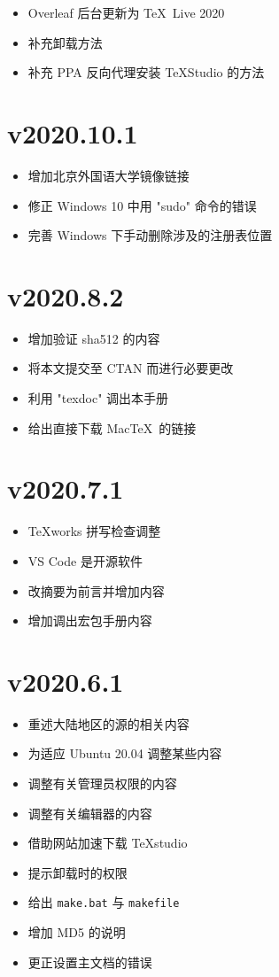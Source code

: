 \begin{itemize}
  \item Overleaf 后台更新为 \TeX~Live 2020
  \item 补充卸载方法
  \item 补充 PPA 反向代理安装 \TeX Studio 的方法
\end{itemize}

\section*{v2020.10.1}

\begin{itemize}
  \item 增加北京外国语大学镜像链接
  \item 修正 Windows 10 中用 "sudo" 命令的错误
  \item 完善 Windows 下手动删除涉及的注册表位置
\end{itemize}

\section*{v2020.8.2}

\begin{itemize}
  \item 增加验证 sha512 的内容
  \item 将本文提交至 CTAN 而进行必要更改
  \item 利用 "texdoc" 调出本手册
  \item 给出直接下载 Mac\TeX\ 的链接
\end{itemize}

\section*{v2020.7.1}

\begin{itemize}
  \item \TeX works 拼写检查调整
  \item VS Code 是开源软件
  \item 改摘要为前言并增加内容
  \item 增加调出宏包手册内容
\end{itemize}

\section*{v2020.6.1}

\begin{itemize}
  \item 重述大陆地区的源的相关内容
  \item 为适应 Ubuntu 20.04 调整某些内容
  \item 调整有关管理员权限的内容
  \item 调整有关编辑器的内容
  \item 借助网站加速下载 TeXstudio
  \item 提示卸载时的权限
  \item 给出 \texttt{make.bat} 与 \texttt{makefile}
  \item 增加 MD5 的说明
  \item 更正设置主文档的错误
\end{itemize}

